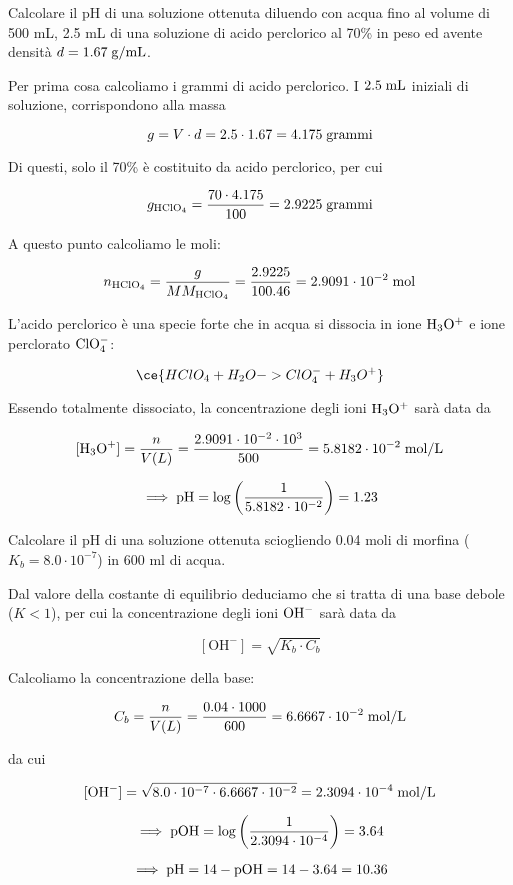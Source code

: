 \newpage

\begin{esercizio}
    Calcolare il pH di una soluzione ottenuta diluendo con acqua fino al volume di 500 mL, 2.5 mL di una soluzione di acido perclorico al 70\% in peso ed avente densità $d=1.67 \; \rm g/mL$.
\end{esercizio}
\begin{soluzione}
    Per prima cosa calcoliamo i grammi di acido perclorico. I $2.5 \; \rm mL$ iniziali di soluzione, corrispondono alla massa

$$g=V \cdot d=2.5 \cdot 1.67=4.175 \; \rm grammi$$

Di questi, solo il 70\% è costituito da acido perclorico, per cui

$$g_{\rm HClO_4}
=\frac{70 \cdot 4.175}{100}
=2.9225 \; \rm grammi$$

A questo punto calcoliamo le moli:

$$n_{\rm HClO_4}
=\frac{g}{MM_{\rm HClO_4}}
=\frac{2.9225}{100.46}=2.9091 \cdot 10^{-2} \; \rm mol$$

L'acido perclorico è una specie forte che in acqua si dissocia in ione $\rm H_3O^+$ e ione perclorato $\rm ClO_4^-$:

$$\ce{HClO_4 + H_2O -> ClO_4^- + H_3O^+}$$

Essendo totalmente dissociato, la concentrazione degli ioni $\rm H_3O^+$ sarà data da

$$[\text{H}_3\text{O}^+]=\frac{n}{V(L)}=\frac{2.9091 \cdot 10^{-2} \cdot 10^{3}}{500}=5.8182 \cdot 10^{-2} \; \rm mol/L$$

$$\implies \rm pH=\log{\left( \frac{1}{5.8182 \cdot 10^{-2}} \right)}=1.23$$
\end{soluzione}

\newpage

\begin{esercizio}
    Calcolare il pH di una soluzione ottenuta sciogliendo 0.04 moli di morfina ($K_b = 8.0 \cdot 10^{-7}$) in 600 ml di acqua.
\end{esercizio}
\begin{soluzione}
    Dal valore della costante di equilibrio deduciamo che si tratta di una base debole ($K<1$), per cui la concentrazione degli ioni $\rm OH^-$ sarà data da

$$[\text{OH}^-]=\sqrt{K_b \cdot C_b}$$

Calcoliamo la concentrazione della base:

$$C_b=\frac{n}{V(L)}=
\frac{0.04 \cdot 1000}{600}=6.6667 \cdot 10^{-2} \; \rm mol/L$$

da cui

$$\rm [OH^-]=\sqrt{8.0 \cdot 10^{-7} \cdot 6.6667 \cdot 10^{-2}}
=2.3094 \cdot 10^{-4} \; \rm mol/L$$

$$\implies \rm pOH=\log{\left(\frac{1}{2.3094 \cdot 10^{-4}}\right)}
=3.64$$

$$\implies \rm pH=14 - pOH
=14-3.64=10.36$$

\end{soluzione}

